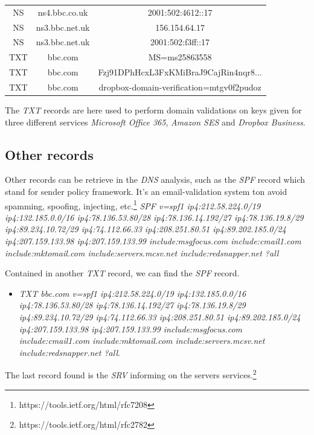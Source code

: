 \documentclass[conference]{IEEEtran}
\begin{document}
\begin{table}[h!]
\begin{tabular}{|c|c|c|}
        NS & ns4.bbc.co.uk & 2001:502:4612::17\\
        NS & ns3.bbc.net.uk & 156.154.64.17\\
        NS & ns3.bbc.net.uk & 2001:502:f3ff::17\\
        TXT & bbc.com & MS=ms25863558\\
        TXT & bbc.com & Fzj91DPhHcxL3FxKMiBraJ9CajRin4nqr8...\\
        TXT & bbc.com & dropbox-domain-verification=mtgv0f2pudoz\\
        \hline
    \end{tabular}
     \label{tab:my_label}
 \end{table}
 
 The \textit{TXT} records are here used to perform domain validations on keys given for three different services \textit{Microsoft Office 365}, \textit{Amazon SES} and \textit{Dropbox Business}. 
 
 \subsection{Other records}
 Other records can be retrieve in the \textit{DNS} analysis, such as the \textit{SPF} record which stand for sender policy framework. It's an email-validation system ton avoid spamming, spoofing, injecting, etc.\footnote{https://tools.ietf.org/html/rfc7208}
\textit{SPF v=spf1 ip4:212.58.224.0/19 ip4:132.185.0.0/16 ip4:78.136.53.80/28 ip4:78.136.14.192/27 ip4:78.136.19.8/29 ip4:89.234.10.72/29 ip4:74.112.66.33 ip4:208.251.80.51 ip4:89.202.185.0/24 ip4:207.159.133.98 ip4:207.159.133.99 include:msgfocus.com include:cmail1.com include:mktomail.com include:servers.mcsv.net include:redsnapper.net ?all}

Contained in another \textit{TXT} record, we can find the \textit{SPF} record. \begin{itemize}
\item\textit{TXT bbc.com v=spf1 ip4:212.58.224.0/19 ip4:132.185.0.0/16 ip4:78.136.53.80/28 ip4:78.136.14.192/27 ip4:78.136.19.8/29 ip4:89.234.10.72/29 ip4:74.112.66.33 ip4:208.251.80.51 ip4:89.202.185.0/24 ip4:207.159.133.98 ip4:207.159.133.99 include:msgfocus.com include:cmail1.com include:mktomail.com include:servers.mcsv.net include:redsnapper.net ?all}.
\end{itemize}

The last record found is the \textit{SRV} informing on the servers services.\footnote{https://tools.ietf.org/html/rfc2782}
\end{document}

